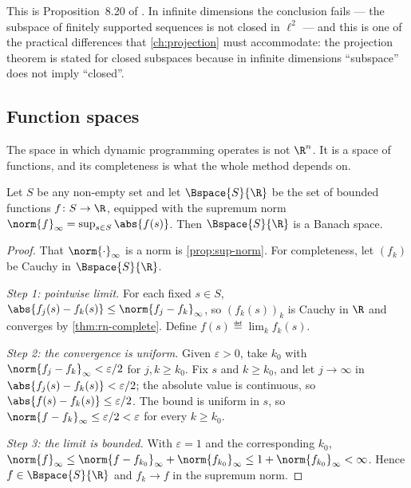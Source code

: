 This is Proposition~8.20 of \textcite[p.~279]{fukuda2026notes}. In infinite
dimensions the conclusion fails --- the subspace of finitely supported sequences
is not closed in $\ell^2$ --- and this is one of the practical differences that
\autoref{ch:projection} must accommodate: the projection theorem is stated for
closed subspaces because in infinite dimensions ``subspace'' does not imply
``closed''.

\subsection{Function spaces}

The space in which dynamic programming operates is not $\R^n$. It is a space of
functions, and its completeness is what the whole method depends on.

\begin{theorem}\label{thm:B-complete}
	Let $S$ be any non-empty set and let $\Bspace{S}{\R}$ be the set of bounded
	functions $f\colon S\to\R$, equipped with the supremum norm
	$\norm{f}_\infty=\sup_{s\in S}\abs{f(s)}$. Then $\Bspace{S}{\R}$ is a Banach
	space.
\end{theorem}

\begin{proof}
	That $\norm{\cdot}_\infty$ is a norm is \autoref{prop:sup-norm}. For
	completeness, let $(f_k)$ be Cauchy in $\Bspace{S}{\R}$.

	\emph{Step 1: pointwise limit.} For each fixed $s\in S$,
	$\abs{f_j(s)-f_k(s)}\leq\norm{f_j-f_k}_\infty$, so $(f_k(s))_k$ is Cauchy in
	$\R$ and converges by \autoref{thm:rn-complete}. Define
	$f(s)\eqdef\lim_kf_k(s)$.

	\emph{Step 2: the convergence is uniform.} Given $\varepsilon>0$, take $k_0$
	with $\norm{f_j-f_k}_\infty<\varepsilon/2$ for $j,k\geq k_0$. Fix $s$ and
	$k\geq k_0$, and let $j\to\infty$ in $\abs{f_j(s)-f_k(s)}<\varepsilon/2$; the
	absolute value is continuous, so $\abs{f(s)-f_k(s)}\leq\varepsilon/2$. The bound
	is uniform in $s$, so $\norm{f-f_k}_\infty\leq\varepsilon/2<\varepsilon$ for
	every $k\geq k_0$.

	\emph{Step 3: the limit is bounded.} With $\varepsilon=1$ and the corresponding
	$k_0$, $\norm{f}_\infty\leq\norm{f-f_{k_0}}_\infty+\norm{f_{k_0}}_\infty
		\leq1+\norm{f_{k_0}}_\infty<\infty$. Hence $f\in\Bspace{S}{\R}$ and
	$f_k\to f$ in the supremum norm.
\end{proof}

